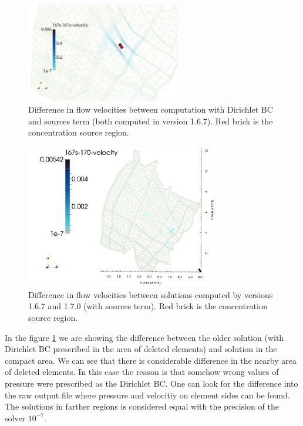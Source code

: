 \begin{figure}[!h]
        \centering
        \includegraphics[width=0.60\textwidth]{tests_graphics/mel_167s-167_velocity.pdf}
        \caption{Difference in flow velocities between computation with Dirichlet BC and sources term (both computed in version 1.6.7). 
                 Red brick is the concentration source region.}
        \label{fig:bench_mel1}
\end{figure}
%
\begin{figure}[!h]
        \centering
        \includegraphics[width=0.75\textwidth]{tests_graphics/mel_167s-170_velocity.pdf}
        \caption{Difference in flow velocities between solutions computed by versions 1.6.7 and 1.7.0 (with sources term).
                 Red brick is the concentration source region.}
        \label{fig:bench_mel2}
\end{figure}


In the figure \ref{fig:bench_mel1} we are showing the difference between the older solution (with Dirichlet BC 
prescribed in the area of deleted elements) and solution in the compact area. We can see that there is 
considerable difference in the nearby area of deleted elements. In this case the reason is that somehow wrong values 
of pressure were prescribed as the Dirichlet BC. One can look for the difference into the raw output file 
where pressure and velocitiy on element sides can be found. The solutions in farther regions is considered equal 
with the precision of the solver $10^{-7}$.


